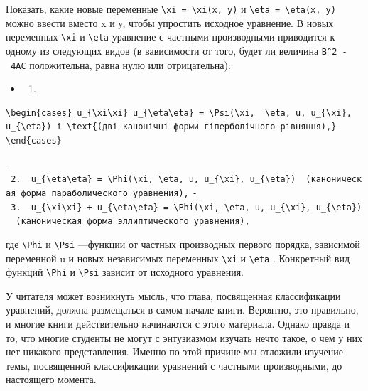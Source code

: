 \documentclass[
  ukrainian,
]{article}
\providecommand{\tightlist}{%
  \setlength{\itemsep}{0pt}\setlength{\parskip}{0pt}}
\begin{document}
Показать, какие новые переменные
\texttt{\textbackslash{}xi\ =\ \textbackslash{}xi(x,\ y)} и
\texttt{\textbackslash{}eta\ =\ \textbackslash{}eta(x,\ y)} можно ввести
вместо x и y, чтобы упростить исходное уравнение. В новых переменных
\texttt{\textbackslash{}xi} и \texttt{\textbackslash{}eta} уравнение с
частными производными приводится к одному из следующих видов (в
вависимости от того, будет ли величина \texttt{B\^{}2\ -\ 4AC}
положительна, равна нулю или отрицательна):

\begin{itemize}
\tightlist
\item
  \begin{enumerate}
  \def\labelenumi{\arabic{enumi}.}
  \tightlist
  \item
  \end{enumerate}
\end{itemize}

\begin{verbatim}
\begin{cases} u_{\xi\xi} u_{\eta\eta} = \Psi(\xi,  \eta, u, u_{\xi}, u_{\eta}) і \text{(дві канонічні форми гіперболічного рівняння),} \end{cases}
\end{verbatim}

\texttt{-\ 2.\ \ \textquotesingle{}u\_\{\textbackslash{}eta\textbackslash{}eta\}\ =\ \textbackslash{}Phi(\textbackslash{}xi,\ \textbackslash{}eta,\ u,\ u\_\{\textbackslash{}xi\},\ u\_\{\textbackslash{}eta\})\textquotesingle{}\ \ (каноническая\ форма\ параболического\ уравнения),}
\texttt{-\ 3.\ \ \textquotesingle{}u\_\{\textbackslash{}xi\textbackslash{}xi\}\ +\ u\_\{\textbackslash{}eta\textbackslash{}eta\}\ =\ \textbackslash{}Phi(\textbackslash{}xi,\ \textbackslash{}eta,\ u,\ u\_\{\textbackslash{}xi\},\ u\_\{\textbackslash{}eta\})\textquotesingle{}\ \ (каноническая\ форма\ эллиптического\ уравнения),}

где \texttt{\textbackslash{}Phi} и \texttt{\textbackslash{}Psi}
---функции от частных производных первого порядка, зависимой переменной
u и новых независимых переменных \texttt{\textbackslash{}xi} и
\texttt{\textbackslash{}eta} . Конкретный вид функций
\texttt{\textbackslash{}Phi} и \texttt{\textbackslash{}Psi} зависит от
исходного уравнения.

У читателя может возникнуть мысль, что глава, посвященная классификации
уравнений, должна размещаться в самом начале книги. Вероятно, это
правильно, и многие книги действительно начинаются с этого материала.
Однако правда и то, что многие студенты не могут с энтузиазмом изучать
нечто такое, о чем у них нет никакого представления. Именно по этой
причине мы отложили изучение темы, посвященной классификации уравнений с
частными производными, до настоящего момента.
\end{document}
